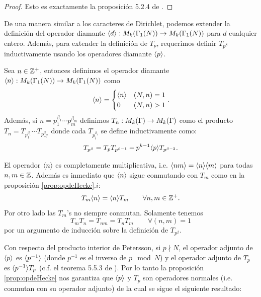\begin{proof}
  Esto es exactamente la proposici\'on 5.2.4 de \cite{DiamondShurmanAFCIMF}.
\end{proof}

De una manera similar a los caracteres de Dirichlet, podemos extender la definici\'on del operador
diamante $\langle d \rangle:M_k(\Gamma_1(N))\rightarrow M_k(\Gamma_1(N))$ para $d$ cualquier entero. Adem\'as, para extender
la definici\'on de $T_p$, requerimos definir $T_{p^{\beta}}$ inductivamente usando los operadores
diamante $\langle p \rangle$.
\begin{defin}
  Sea $n\in\mathbb{Z}^+$, entonces definimos el operador diamante
  $\langle n \rangle:M_k(\Gamma_1(N))\rightarrow M_k(\Gamma_1(N))$ como
  \[
    \langle n \rangle=
    \begin{cases}
      \langle n \rangle & (N,n)=1\\
      0 & (N,n)>1
    \end{cases}.
  \]
  Adem\'as, si $n=p_1^{\beta_1}\cdots p_m^{\beta_m}$ definimos $T_n:M_k(\Gamma)\rightarrow M_k(\Gamma)$
  como el producto $T_n=T_{p_1^{\beta_1}}\cdots T_{p_m^{\beta_m}}$ donde cada $T_{p_i^{\beta_i}}$ se
  define inductivamente como:
  \[
    T_{p^{\beta}}=T_pT_{p^{\beta-1}}-p^{k-1}\langle p \rangle T_{p^{\beta-2}}.
  \]
\end{defin}

\begin{notas}
  El operador $\langle n \rangle$ es completamente multiplicativa, i.e. $\langle nm \rangle=\langle n \rangle\langle m \rangle$ para todas
  $n,m\in\mathbb{Z}$. Adem\'as es inmediato que $\langle n \rangle$ sigue conmutando con $T_m$ como en la proposici\'on
  \ref{prop:opdeHecke}.$i$:
  \begin{equation}
    \label{eq:Tnconmuta}
    T_m\langle n \rangle=\langle n \rangle T_m\qquad\forall n,m\in\mathbb{Z}^+.
  \end{equation}
  Por otro lado las $T_m$'s no siempre conmutan. Solamente tenemos
  \begin{equation}
    \label{eq:Tnconmutaprimo}
    T_mT_n=T_{nm}=T_nT_m\qquad\forall (n,m)=1
  \end{equation}
  por un argumento de inducci\'on sobre la definici\'on de $T_{p^{\beta}}$.
\end{notas}
\begin{nota}
  Con respecto del producto interior de Petersson, si $p\nmid N$, el operador adjunto de
  $\langle p \rangle$ es $\langle p^{-1} \rangle$ (donde $p^{-1}$ es el inverso de $p\mod N$) y el operador adjunto de $T_p$ es $\langle p^{-1} \rangle T_p$ (c.f. el teorema
  5.5.3 de \cite{DiamondShurmanAFCIMF}). Por lo tanto la proposici\'on \ref{prop:opdeHecke} nos
  garantiza que $\langle p \rangle$ y $T_p$ son operadores normales (i.e. conmutan con su operador adjunto)
  de la cual se sigue el siguiente resultado:
\end{nota}

